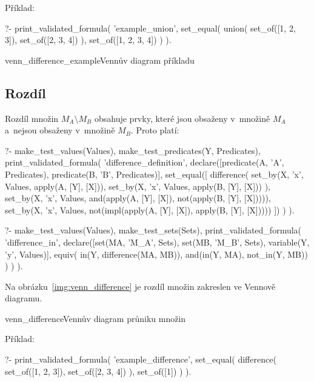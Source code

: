Příklad:

\begin{prolog}
?-	print_validated_formula(
		'example_union',
		set_equal(
			union(
				set_of([1, 2, 3]),
				set_of([2, 3, 4])
			),
			set_of([1, 2, 3, 4])
		)
	).
\end{prolog}

\begin{fig}{venn_difference_example}{Vennův diagram příkladu}
\end{fig}

\subsection{Rozdíl}

Rozdíl množin \(M_A \setminus M_B\) obsahuje prvky, které jsou obsaženy v~množině \(M_A\) a~nejsou obsaženy v~množině \(M_B\). Proto platí:

\begin{prolog}
?- 	make_test_values(Values),
	make_test_predicates(Y, Predicates),
	print_validated_formula(
		'difference_definition',
		declare([predicate(A, 'A', Predicates), predicate(B, 'B', Predicates)],
			set_equal([
				difference(
					set_by(X, 'x', Values, apply(A, [Y], [X])),
					set_by(X, 'x', Values, apply(B, [Y], [X]))
				),
				set_by(X, 'x', Values, and(apply(A, [Y], [X]), not(apply(B, [Y], [X])))),
				set_by(X, 'x', Values, not(impl(apply(A, [Y], [X]), apply(B, [Y], [X]))))
			])
		)
	).
\end{prolog}

\begin{prolog}
?- 	make_test_values(Values),
	make_test_sets(Sets),
	print_validated_formula(
		'difference_in',
		declare([set(MA, 'M_A', Sets), set(MB, 'M_B', Sets), variable(Y, 'y', Values)],
			equiv(
				in(Y, difference(MA, MB)),
				and(in(Y, MA), not_in(Y, MB))
			)
		)
	).
\end{prolog}

Na obrázku~\ref{img:venn_difference} je rozdíl množin zakreslen ve Vennově diagramu.

\begin{fig}{venn_difference}{Vennův diagram průniku množin}
\end{fig}

Příklad:

\begin{prolog}
?-	print_validated_formula(
		'example_difference',
		set_equal(
			difference(
				set_of([1, 2, 3]),
				set_of([2, 3, 4])
			),
			set_of([1])
		)
	).
\end{prolog}


